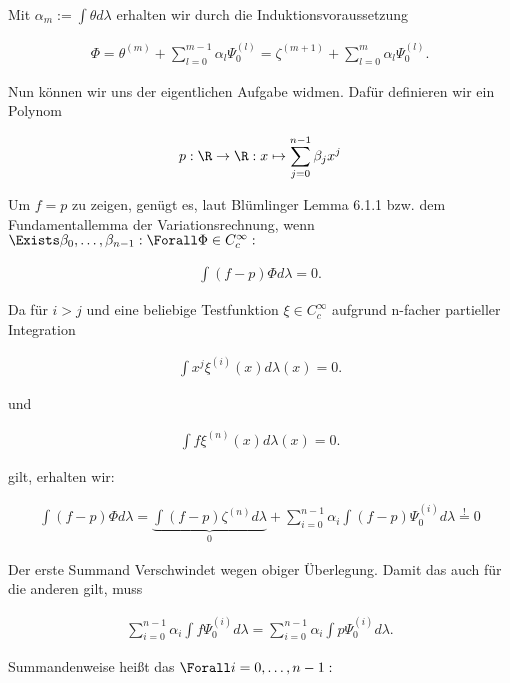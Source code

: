 \begin{solution}
Mit $\alpha_m:=\int\theta d\lambda$ erhalten wir durch die Induktionsvoraussetzung

\begin{align*}
  \Phi
  = \theta^{(m)} +
    \sum_{l=0}^{m-1}
    \alpha_l \Psi_0^{(l)}
  = \zeta^{(m+1)} +
    \sum_{l=0}^{m}
    \alpha_l \Psi_0^{(l)}.
\end{align*}

Nun können wir uns der eigentlichen Aufgabe widmen. Dafür definieren wir ein Polynom

\begin{align*}
    p: \R \to \R: x \mapsto \sum_{j=0}^{n-1} \beta_j x^j
\end{align*}

Um $f = p$ zu zeigen, genügt es, laut Blümlinger Lemma 6.1.1 bzw. dem Fundamentallemma der Variationsrechnung, wenn $\Exists \beta_0, \dots, \beta_{n-1}: \Forall \Phi \in C_c^\infty:$

\begin{align}
    \int (f-p) \Phi d \lambda = 0. \label{eq:wunsch}
\end{align}

Da für $i>j$ und eine beliebige Testfunktion $\xi \in C_c^\infty$ aufgrund n-facher partieller Integration

\begin{align*}
    \int x^j \xi^{(i)}(x) d \lambda(x) = 0.
\end{align*}

und

\begin{align*}
    \int f \xi^{(n)}(x) d \lambda(x) = 0.
\end{align*}

gilt, erhalten wir:

\begin{align*}
  \int (f-p) \Phi d \lambda
  = \underbrace{\int (f-p) \zeta^{(n)} d \lambda}_0 +
    \sum_{i=0}^{n-1} \alpha_i
    \int(f-p) \Psi_0^{(i)} d \lambda
  \stackrel{!}{=} 0
\end{align*}

Der erste Summand Verschwindet wegen obiger Überlegung. Damit das auch für die anderen gilt, muss

\begin{align*}
    \sum_{i=0}^{n-1} \alpha_i
    \int f \Psi_0^{(i)} d \lambda =
    \sum_{i=0}^{n-1}
    \alpha_i
    \int p \Psi_0^{(i)} d \lambda.
\end{align*}

Summandenweise heißt das $\Forall i = 0, \dots, n-1:$


\end{solution}

